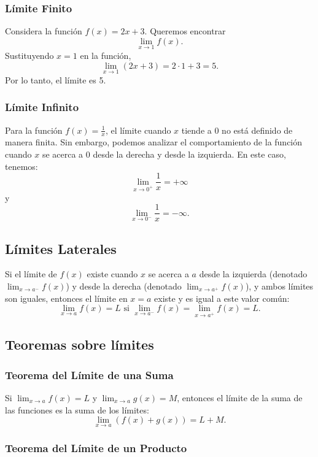     

\subsubsection{Límite Finito}

Considera la función \( f(x) = 2x + 3 \). Queremos encontrar
\[
\lim_{x \to 1} f(x).
\]
Sustituyendo \( x = 1 \) en la función,
\[
\lim_{x \to 1} (2x + 3) = 2 \cdot 1 + 3 = 5.
\]
Por lo tanto, el límite es 5.

\subsubsection{Límite Infinito}

Para la función \( f(x) = \frac{1}{x} \), el límite cuando \( x \) tiende a 0 no está definido de manera finita. Sin embargo, podemos analizar el comportamiento de la función cuando \( x \) se acerca a 0 desde la derecha y desde la izquierda. En este caso, tenemos:
\[
\lim_{x \to 0^+} \frac{1}{x} = +\infty
\]
y
\[
\lim_{x \to 0^-} \frac{1}{x} = -\infty.
\]

\subsection{Límites Laterales}

Si el límite de \( f(x) \) existe cuando \( x \) se acerca a \( a \) desde la izquierda (denotado \( \lim_{x \to a^-} f(x) \)) y desde la derecha (denotado \( \lim_{x \to a^+} f(x) \)), y ambos límites son iguales, entonces el límite en \( x = a \) existe y es igual a este valor común:
\[
\lim_{x \to a} f(x) = L \text{ si } \lim_{x \to a^-} f(x) = \lim_{x \to a^+} f(x) = L.
\]
\subsection{Teoremas sobre límites}

\subsubsection{Teorema del Límite de una Suma}

Si \( \lim_{x \to a} f(x) = L \) y \( \lim_{x \to a} g(x) = M \), entonces el límite de la suma de las funciones es la suma de los límites:
\[
\lim_{x \to a} \left( f(x) + g(x) \right) = L + M.
\]

\subsubsection{Teorema del Límite de un Producto}

